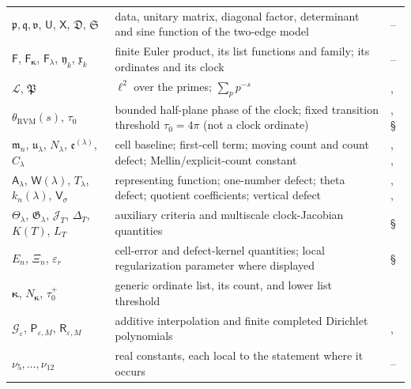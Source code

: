\documentclass[11pt,reqno]{amsart}
\makeatletter
\let\CG@origref\ref
\let\CG@origeqref\eqref
\newcommand{\CG@gettip}[1]{\@ifundefined{CGTip@#1}{Reference: #1}{\csname CGTip@#1\endcsname}}
\DeclareRobustCommand{\CGref}[1]{\pdftooltip{\CG@origref{#1}}{\CG@gettip{#1}}}
\DeclareRobustCommand{\CGeqref}[1]{\pdftooltip{\CG@origeqref{#1}}{\CG@gettip{#1}}}
\numberwithin{equation}{section}
\theoremstyle{plain}
\theoremstyle{definition}
\theoremstyle{remark}
\newcommand{\RVM}{\mathrm{RVM}}
\makeatother
\begin{document}
{\begin{longtable}{>{\raggedright\arraybackslash}p{}>{\raggedright\arraybackslash}p{}>{\raggedright\arraybackslash}p{}}
$\mathfrak p,\mathfrak q,\mathfrak v$, $\mathsf U$, $\mathsf X$, $\mathfrak D$, $\mathfrak S$ & data, unitary matrix, diagonal factor, determinant and sine function of the two-edge model & \CGeqref{eq:graph-matrices}--\CGeqref{eq:graph-sine}\\
$\mathsf F$, $\mathsf F_{\boldsymbol{\kappa}}$, $\mathsf F_\lambda$, $\mathfrak y_k$, $\mathfrak x_k$ & finite Euler product, its list functions and family; its ordinates and its clock & \CGeqref{eq:finite-euler}--\CGeqref{eq:finite-euler-list}\\
$\mathscr L$, $\mathfrak P$ & $\ell^2$ over the primes; $\sum_pp^{-s}$ & \CGeqref{eq:prime-det}, \CGeqref{eq:prime-det2}\\
$\theta_{\RVM}(s)$, $\tau_0$ & bounded half-plane phase of the clock; fixed transition threshold $\tau_0=4\pi$ (not a clock ordinate) & \CGeqref{eq:halfplane-RVM}, \S\CGref{subsec:transition-proof}\\
$\mathfrak m_n$, $\mathfrak u_\lambda$, $N_\lambda$, $\mathfrak e^{(\lambda)}$, $C_\lambda$ & cell baseline; first-cell term; moving count and count defect; Mellin/explicit-count constant & \CGeqref{eq:cell-mass-W}, \CGeqref{eq:joining-factor}, \CGeqref{eq:family-count-primitive}\\
$\mathsf A_\lambda$, $\mathsf W(\lambda)$, $T_\lambda$, $k_n(\lambda)$, $\mathsf V_\sigma$ & representing function; one-number defect; theta defect; quotient coefficients; vertical defect & \CGeqref{eq:one-number}, \CGeqref{eq:theta-defect}, \CGeqref{eq:vertical-defect}\\
$\Theta_\lambda$, $\mathfrak G_\lambda$, $\mathcal J_T$, $\Delta_T$, $K(T)$, $L_T$ & auxiliary criteria and multiscale clock-Jacobian quantities & \S\CGref{sec:criteria}\\
$E_n$, $\Xi_n$, $\varepsilon_r$ & cell-error and defect-kernel quantities; local regularization parameter where displayed & \S\CGref{sec:criteria}\\
$\boldsymbol{\kappa}$, $N_{\boldsymbol{\kappa}}$, $\tau_0^+$ & generic ordinate list, its count, and lower list threshold & \CGeqref{eq:list-space}\\
$\mathcal G_\varepsilon$, $\mathsf P_{\varepsilon,M}$, $\mathsf R_{\varepsilon,M}$ & additive interpolation and finite completed Dirichlet polynomials & \CGeqref{eq:additive-family-v18}, \CGeqref{eq:finite-additive-v18}\\
$\nu_5,\dots,\nu_{12}$ & real constants, each local to the statement where it occurs & --\\
\end{longtable}
}
\end{document}
